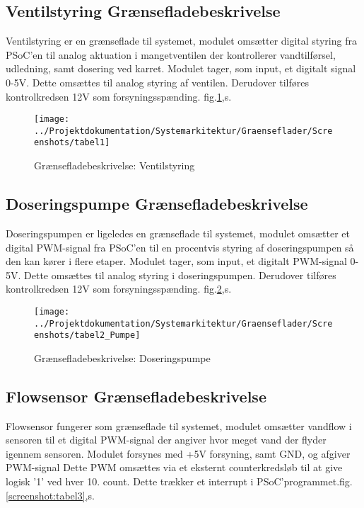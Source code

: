 
\subsection{Ventilstyring Grænsefladebeskrivelse}

Ventilstyring er en grænseflade til systemet, modulet omsætter digital styring fra PSoC'en til analog aktuation i mangetventilen der kontrollerer vandtilførsel, udledning, samt dosering ved karret. 
Modulet tager, som input, et digitalt signal 0-5V. Dette omsættes til analog styring af ventilen. 
Derudover tilføres kontrolkredsen 12V som forsyningsspænding. fig.\ref{screenshot:tabel1},s.\pageref{screenshot:tabel1}

\begin{figure}[H]
	\centering
	\texttt{[image: ../Projektdokumentation/Systemarkitektur/Graenseflader/Screenshots/tabel1]}
	\caption{Grænsefladebeskrivelse: Ventilstyring}
	\label{screenshot:tabel1}
\end{figure}


\subsection{Doseringspumpe Grænsefladebeskrivelse}

Doseringspumpen er ligeledes en grænseflade til systemet, modulet omsætter et digital PWM-signal fra PSoC'en til en procentvis styring af doseringspumpen så den kan kører i flere etaper. Modulet tager, som input, et digitalt PWM-signal 0-5V. Dette omsættes til analog styring i doseringspumpen. 
Derudover tilføres kontrolkredsen 12V som forsyningsspænding. fig.\ref{screenshot:tabel2},s.\pageref{screenshot:tabel2}  

\begin{figure}[H]
	\centering
	\texttt{[image: ../Projektdokumentation/Systemarkitektur/Graenseflader/Screenshots/tabel2\_Pumpe]}
	\caption{Grænsefladebeskrivelse: Doseringspumpe}
	\label{screenshot:tabel2}
\end{figure}


\subsection{Flowsensor Grænsefladebeskrivelse}
Flowsensor fungerer som grænseflade til systemet, modulet omsætter vandflow i sensoren til et digital PWM-signal der angiver hvor meget vand der flyder igennem sensoren. Modulet forsynes med +5V forsyning, samt GND, og afgiver PWM-signal 
Dette PWM omsættes via et eksternt counterkredsløb til at give logisk '1' ved hver 10. count. Dette trækker et interrupt i PSoC'programmet.fig.\ref{screenshot:tabel3},s.\pageref{screenshot:tabel3}

